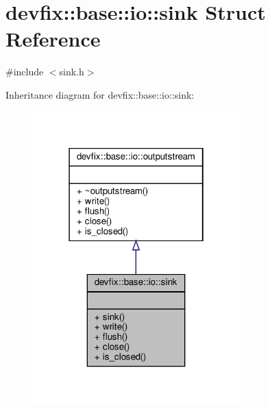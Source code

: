 \hypertarget{structdevfix_1_1base_1_1io_1_1sink}{}\section{devfix\+:\+:base\+:\+:io\+:\+:sink Struct Reference}
\label{structdevfix_1_1base_1_1io_1_1sink}


{\ttfamily \#include $<$sink.\+h$>$}



Inheritance diagram for devfix\+:\+:base\+:\+:io\+:\+:sink\+:\nopagebreak
\begin{figure}[H]
\begin{center}
\leavevmode
\includegraphics[width=226pt]{structdevfix_1_1base_1_1io_1_1sink__inherit__graph}
\end{center}
\end{figure}
